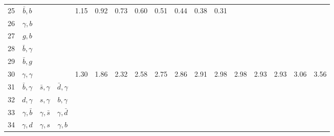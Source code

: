 \begin{tabular}{rccc@{}S@{}S@{}S@{}S@{}S@{}S@{}S@{}S@{}S@{}S@{}S@{}S@{}S}
  25 & $\bar b,b$       &                  &                 &  1.15 &  0.92 &  0.73 &  0.60 &  0.51 & 0.44 & 0.38 & 0.31 &      &      &      &      &      \\
  26 & $\gamma, b$      &                  &                 &       &       &       &       &       &      &      &      &      &      &      &      &      \\
  27 & $g,b$            &                  &                 &       &       &       &       &       &      &      &      &      &      &      &      &      \\
  28 & $\bar b,\gamma$  &                  &                 &       &       &       &       &       &      &      &      &      &      &      &      &      \\
  29 & $\bar b,g$       &                  &                 &       &       &       &       &       &      &      &      &      &      &      &      &      \\
  30 & $\gamma,\gamma$  &                  &                 &  1.30 &  1.86 &  2.32 &  2.58 &  2.75 & 2.86 & 2.91 & 2.98 & 2.98 & 2.93 & 2.93 & 3.06 & 3.56 \\
  31 & $\bar b,\gamma$  & $\bar s,\gamma$  & $\bar d,\gamma$ &       &       &       &       &       &      &      &      &      &      &      &      &      \\
  32 & $d,\gamma$       & $s,\gamma$       & $b,\gamma$      &       &       &       &       &       &      &      &      &      &      &      &      &      \\
  33 & $\gamma,\bar b$  & $\gamma,\bar s$  & $\gamma,\bar d$ &       &       &       &       &       &      &      &      &      &      &      &      &      \\
  34 & $\gamma,d$       & $\gamma,s$       & $\gamma, b$     &       &       &       &       &       &      &      &      &      &      &      &      &      \\
  \bottomrule
\end{tabular}
